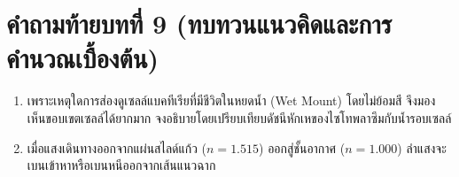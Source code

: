 \section*{คำถามท้ายบทที่ 9 (ทบทวนแนวคิดและการคำนวณเบื้องต้น)}
\begin{enumerate}
    \item เพราะเหตุใดการส่องดูเซลล์แบคทีเรียที่มีชีวิตในหยดน้ำ (Wet Mount) โดยไม่ย้อมสี จึงมองเห็นขอบเขตเซลล์ได้ยากมาก จงอธิบายโดยเปรียบเทียบดัชนีหักเหของไซโทพลาซึมกับน้ำรอบเซลล์
    \item เมื่อแสงเดินทางออกจากแผ่นสไลด์แก้ว ($n = 1.515$) ออกสู่ชั้นอากาศ ($n = 1.000$) ลำแสงจะเบนเข้าหาหรือเบนหนีออกจากเส้นแนวฉาก
\end{enumerate}
